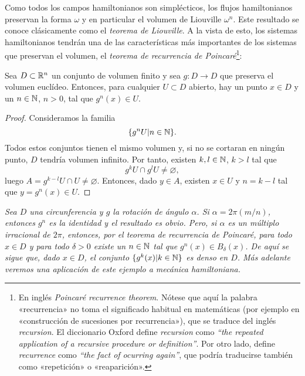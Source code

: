   Como todos los campos hamiltonianos son simplécticos, los flujos hamiltonianos preservan la forma $\omega$ y en particular el volumen de Liouville $\omega^n$. Este resultado se conoce clásicamente como el \emph{teorema de Liouville}. A la vista de esto, los sistemas hamiltonianos tendrán una de las características más importantes de los sistemas que preservan el volumen, el \emph{teorema de recurrencia de Poincaré}\footnote{En inglés \textit{Poincaré recurrence theorem}. Nótese que aquí la palabra «recurrencia» no toma el significado habitual en matemáticas (por ejemplo en «construcción de sucesiones por recurrencia»), que se traduce del inglés \textit{recursion}. El diccionario Oxford define \textit{recursion} como \textit{``the repeated application of a recursive procedure or definition''}. Por otro lado, define \textit{recurrence} como \textit{``the fact of ocurring again''}, que podría traducirse también como «repetición» o «reaparición».}:
  \begin{prop}\label{tpoincare}
 Sea $D\subset \mathbb{R}^n$ un conjunto de volumen finito y sea $g:D\rightarrow D$ que preserva el volumen euclídeo. Entonces, para cualquier $U\subset D$ abierto, hay un punto $x\in D$ y un $n\in \mathbb{N}$, $n>0$, tal que $g^n(x) \in U$.
\end{prop}
\begin{proof}
  Consideramos la familia
  \begin{equation*}
    \{g^nU | n \in \mathbb{N} \}.
  \end{equation*}
  Todos estos conjuntos tienen el mismo volumen y, si no se cortaran en ningún punto, $D$ tendría volumen infinito. Por tanto, existen $k,l\in \mathbb{N}$, $k>l$ tal que
  \begin{equation*}
    g^kU\cap g^lU \neq \varnothing,
  \end{equation*}
  luego $A=g^{k-l}U \cap U \neq \varnothing$. Entonces, dado $y\in A$, existen $x \in U$ y $n=k-l$ tal que $y=g^n(x)\in U$.
\end{proof}
\begin{ejemplo}
  \em
  Sea $D$ una circunferencia y $g$ la rotación de ángulo $\alpha$. Si $\alpha=2\pi(m/n)$, entonces $g^n$ es la identidad y el resultado es obvio. Pero, si $\alpha$ es un múltiplo irracional de $2\pi$, entonces, por el teorema de recurrencia de Poincaré, para todo $x\in D$ y para todo $\delta>0$ existe un $n\in \mathbb{N}$ tal que $g^n(x) \in B_{\delta}(x)$.
  De aquí se sigue que, dado $x \in D$, el conjunto $\{g^k(x)|k\in \mathbb{N}\}$ es denso en $D$. Más adelante veremos una aplicación de este ejemplo a mecánica hamiltoniana.
\end{ejemplo}

